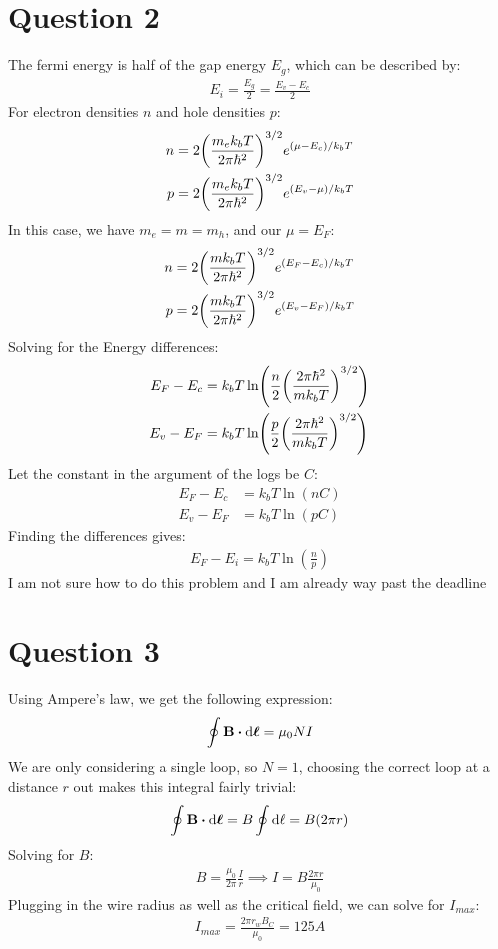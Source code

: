 \documentclass[12pt]{article}
\begin{document}
\section{Question 2}
The fermi energy is half of the gap energy $E_g$, which can be described by:
\begin{align*}
  E_i=\frac{E_g}{2}=\frac{E_v-E_c}{2}
\end{align*}
For electron densities $n$ and hole densities $p$:
\begin{align*}
  n&=2\qty(\frac{m_ek_bT}{2\pi\hbar^2})^{3/2}e^{(\mu-E_c)/k_bT}\\
  p&=2\qty(\frac{m_ek_bT}{2\pi\hbar^2})^{3/2}e^{(E_v-\mu)/k_bT}
\end{align*}
In this case, we have $m_e=m=m_h$, and our $\mu=E_F$:
\begin{align*}
  n&=2\qty(\frac{mk_bT}{2\pi\hbar^2})^{3/2}e^{(E_F-E_c)/k_bT}\\
  p&=2\qty(\frac{mk_bT}{2\pi\hbar^2})^{3/2}e^{(E_v-E_F)/k_bT}  
\end{align*}
Solving for the Energy differences:
\begin{align*}
  E_F-E_c&=k_bT\ln(\frac{n}{2}\qty(\frac{2\pi\hbar^2}{mk_bT})^{3/2})\\
  E_v-E_F&=k_bT\ln(\frac{p}{2}\qty(\frac{2\pi\hbar^2}{mk_bT})^{3/2})
\end{align*}
Let the constant in the argument of the logs be $C$:
\begin{align*}
  E_F-E_c&=k_bT\ln(nC)\\
  E_v-E_F&=k_bT\ln(pC)  
\end{align*}
Finding the differences gives:
\begin{align*}
  \boxed{E_F-E_i=k_bT\ln(\frac{n}{p})}
\end{align*}
I am not sure how to do this problem and I am already way past the deadline

\section{Question 3}
Using Ampere's law, we get the following expression:
\begin{align*}
  \oint\vb{B}\vdot\dd{\bm{\ell}}=\mu_0NI
\end{align*}
We are only considering a single loop, so $N=1$, choosing the correct loop at a distance $r$ out makes this integral fairly trivial:
\begin{align*}
  \oint\vb{B}\vdot\dd{\bm{\ell}}=B\oint\dd{\ell}=B(2\pi r)
\end{align*}
Solving for $B$:
\begin{align*}
  B=\frac{\mu_0}{2\pi}\frac{I}{r}\implies I=B\frac{2\pi r}{\mu_0}
\end{align*}
Plugging in the wire radius as well as the critical field, we can solve for $I_{max}$:
\begin{align*}
  I_{max}=\frac{2\pi r_w B_C}{\mu_0}=\boxed{125 A}
\end{align*}
\end{document}
